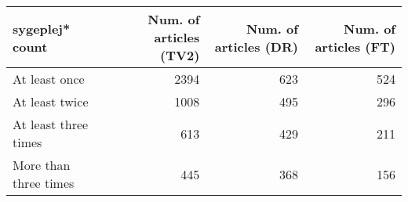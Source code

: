 \begin{tabular}{lrrr}
\toprule
      sygeplej* count &  Num. of articles (TV2) &  Num. of articles (DR) &  Num. of articles (FT) \\
\midrule
        At least once &                    2394 &                    623 &                    524 \\
       At least twice &                    1008 &                    495 &                    296 \\
 At least three times &                     613 &                    429 &                    211 \\
More than three times &                     445 &                    368 &                    156 \\
\bottomrule
\end{tabular}
